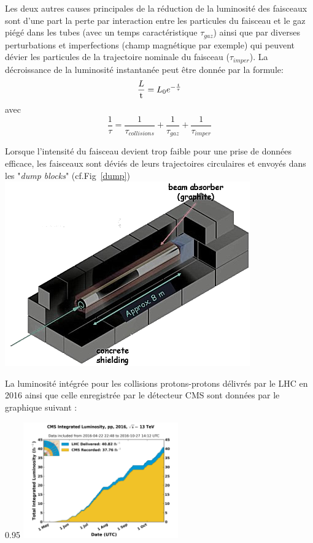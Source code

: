 Les deux autres causes principales de la réduction de la luminosité des faisceaux sont d'une part la perte par interaction entre les particules du faisceau et le gaz piégé dans les tubes (avec un temps caractéristique $\tau_{gaz}$) ainsi que par diverses perturbations et imperfections (champ magnétique par exemple) qui peuvent dévier les particules de la trajectoire nominale du faisceau ($\tau_{imper}$). 
La décroissance de la luminosité instantanée peut être donnée par la formule:
\begin{equation}
\frac{\mathrm \mathcal{L}}{\mathrm t} = L_{0} e^{-\frac{t}{\tau}}
\end{equation}
avec
\begin{equation}
\frac{1}{\tau} = \frac{1}{\tau_{collisions}}+\frac{1}{\tau_{gaz}}+\frac{1}{\tau_{imper}}
\end{equation}

Lorsque l'intensité du faisceau devient trop faible pour une prise de données efficace, les faisceaux sont déviés de leurs trajectoires circulaires et envoyés dans les "\textit{dump blocks}" (cf.Fig~\ref{dump})
\marginpar
{
	\includegraphics[width=\marginparwidth]{LHC/dump.png}
    	\label{dump}
}

La luminosité intégrée pour les collisions protons-protons délivrés par le LHC en \num{2016} ainsi que celle enregistrée par le détecteur CMS sont données par le graphique suivant :

\begin{minipagewithmarginpars}[ht!]{0.95\textwidth}
\centering
\includegraphics[width=0.50\textwidth]{LHC/luminosity.png}
\end{minipagewithmarginpars}


